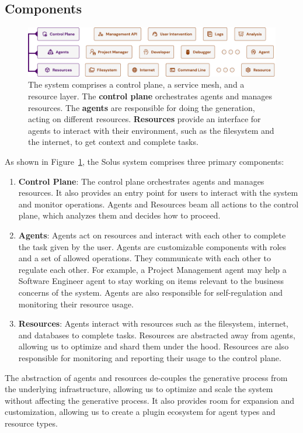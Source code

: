 \documentclass[a4paper,twocolumn,11pt]{quantumarticle}
\begin{document}
\subsection{Components}
\begin{figure}[t]
  \centering
  \includegraphics[width=\textwidth]{figures/components.pdf}
  \caption{The system comprises a control plane, a service mesh, and a resource layer. The \textbf{control plane} orchestrates agents and manages resources. The \textbf{agents} are responsible for doing the generation, acting on different resources. \textbf{Resources} provide an interface for agents to interact with their environment, such as the filesystem and the internet, to get context and complete tasks.}
  \label{fig:components}
\end{figure}
As shown in Figure~\ref{fig:components}, the Solus system comprises three primary components:
\begin{enumerate}
  \item \textbf{Control Plane}: The control plane orchestrates agents and manages resources. It also provides an entry point for users to interact with the system and monitor operations. Agents and Resources beam all actions to the control plane, which analyzes them and decides how to proceed.
  \item \textbf{Agents}: Agents act on resources and interact with each other to complete the task given by the user. Agents are customizable components with roles and a set of allowed operations. They communicate with each other to regulate each other. For example, a Project Management agent may help a Software Engineer agent to stay working on items relevant to the business concerns of the system. Agents are also responsible for self-regulation and monitoring their resource usage.
  \item \textbf{Resources}: Agents interact with resources such as the filesystem, internet, and databases to complete tasks. Resources are abstracted away from agents, allowing us to optimize and shard them under the hood. Resources are also responsible for monitoring and reporting their usage to the control plane.
\end{enumerate}
The abstraction of agents and resources de-couples the generative process from the underlying infrastructure, allowing us to optimize and scale the system without affecting the generative process. It also provides room for expansion and customization, allowing us to create a plugin ecosystem for agent types and resource types.
\end{document}
